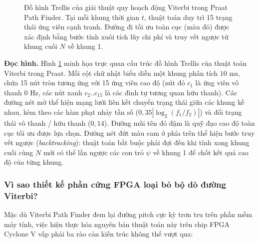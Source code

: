 \begin{figure}[htbp]
    \centering
    
    \caption{Đồ hình Trellis của giải thuật quy hoạch động Viterbi trong Praat Path Finder. Tại mỗi khung thời gian $t$, thuật toán duy trì 15 trạng thái ứng viên cạnh tranh. Đường đi tối ưu toàn cục (màu đỏ) được xác định bằng bước tính xuôi tích lũy chi phí và truy vết ngược từ khung cuối $N$ về khung 1.}
    \label{fig:ch11_viterbi_trellis}
\end{figure}

\textbf{Đọc hình.} Hình \ref{fig:ch11_viterbi_trellis} minh họa trực quan cấu trúc đồ hình Trellis của thuật toán Viterbi trong Praat. Mỗi cột chữ nhật biểu diễn một khung phân tích $10\text{ ms}$, chứa 15 nút tròn tương ứng với 15 ứng viên cao độ (nút đỏ $c_1$ là ứng viên vô thanh $0\text{ Hz}$, các nút xanh $c_2..c_{15}$ là các đỉnh tự tương quan hữu thanh). Các đường nét mờ thể hiện mạng lưới liên kết chuyển trạng thái giữa các khung kề nhau, kèm theo các hàm phạt nhảy tần số ($0{,}35|\log_2(f_1/f_2)|$) và đổi trạng thái vô thanh / hữu thanh ($0{,}14$). Đường mũi tên đỏ đậm là quỹ đạo cao độ toàn cục tối ưu được lựa chọn. Đường nét đứt màu cam ở phía trên thể hiện bước truy vết ngược (\emph{backtracking}): thuật toán bắt buộc phải đợi đến khi tính xong khung cuối cùng $N$ mới có thể lần ngược các con trỏ $\psi$ về khung 1 để chốt kết quả cao độ của từng khung.

\subsubsection*{Vì sao thiết kế phần cứng FPGA loại bỏ bộ dò đường Viterbi?}
Mặc dù Viterbi Path Finder đem lại đường pitch cực kỳ trơn tru trên phần mềm máy tính, việc hiện thực hóa nguyên bản thuật toán này trên chip FPGA Cyclone V vấp phải ba rào cản kiến trúc không thể vượt qua:

